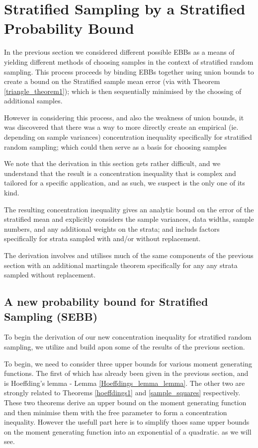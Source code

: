 

\section{Stratified Sampling by a Stratified Probability Bound}\label{section:SEBB}

In the previous section we considered different possible EBBs as a means of yielding different methods of choosing samples in the context of stratified random sampling.
This process proceeds by binding EBBs together using union bounds to create a bound on the Stratified sample mean error (via with Theorem \ref{triangle_theorem1}); which is then sequentially minimised by the choosing of additional samples.

However in considering this process, and also the weakness of union bounds, it was discovered that there was a way to more directly create an empirical (ie. depending on sample variances) concentration inequality specifically for stratified random sampling; which could then serve as a basis for choosing samples

We note that the derivation in this section gets rather difficult, and we understand that the result is a concentration inequality that is complex and tailored for a specific application, and as such, we suspect is the only one of its kind.

The resulting concentration inequality gives an analytic bound on the error of the stratified mean and explicitly considers the sample variances, data widths, sample numbers, and any additional weights on the strata; and includs factors specifically for strata sampled with and/or without replacement.

The derivation involves and utilises much of the same components of the previous section with an additional martingale theorem specifically for any any strata sampled without replacement.

\subsection{A new probability bound for Stratified Sampling (SEBB)}

To begin the derivation of our new concentration inequality for stratified random sampling, we utilize and build apon some of the results of the previous section.


To begin, we need to consider three upper bounds for various moment generating functions.
The first of which has already been given in the previous section, and is Hoeffding's lemma - Lemma \ref{Hoeffdings_lemma_lemma}.
The other two are strongly related to Theorems \ref{hoeffdings1} and \ref{sample_squares} respectively.
These two theorems derive an upper bound on the moment generating function and then minimise them with the free parameter to form a concentration inequality.
However the usefull part here is to simplify thoes same upper bounds on the moment generating function into an exponential of a quadratic. as we will see.




